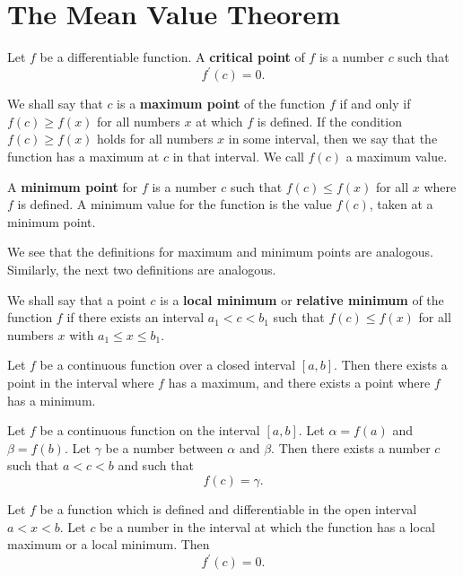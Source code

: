 \chapter*{The Mean Value Theorem}

\begin{definition}
  Let $f$ be a differentiable function. A \textbf{critical point} of $f$ is a number $c$ such that
  \[f^\prime(c) = 0.\]
\end{definition}

\begin{definition}
  We shall say that $c$ is a \textbf{maximum point} of the function $f$ if and only if $f(c) \ge f(x)$ for all numbers $x$ at which $f$ is defined. If the condition $f(c) \ge f(x)$ holds for all numbers $x$ in some interval, then we say that the function has a maximum at $c$ in that interval. We call $f(c)$ a maximum value.
\end{definition}

\begin{definition}
  A \textbf{minimum point} for $f$ is a number $c$ such that $f(c) \le f(x)$ for all $x$ where $f$ is defined. A minimum value for the function is the value $f(c)$, taken at a minimum point.
\end{definition}

We see that the definitions for maximum and minimum points are analogous. Similarly, the next two definitions are analogous.

We shall say that a point $c$ is a \textbf{local minimum} or \textbf{relative minimum} of the function $f$ if there exists an interval $a_1 < c < b_1$ such that $f(c) \le f(x)$ for all numbers $x$ with $a_1 \le x \le b_1$.

\begin{theorem}
  Let $f$ be a continuous function over a closed interval $[a,b]$. Then there exists a point in the interval where $f$ has a maximum, and there exists a point where $f$ has a minimum.
\end{theorem}

\begin{theorem}
  Let $f$ be a continuous function on the interval $[a,b]$. Let $\alpha = f(a)$ and $\beta = f(b)$. Let $\gamma$ be a number between $\alpha$ and $\beta$. Then there exists a number $c$ such that $a < c < b$ and such that
  \[f(c) = \gamma.\]
\end{theorem}

\begin{theorem}
  Let $f$ be a function which is defined and differentiable in the open interval $a < x < b$. Let $c$ be a number in the interval at which the function has a local maximum or a local minimum. Then
  \[f^\prime(c) = 0.\]
\end{theorem}

